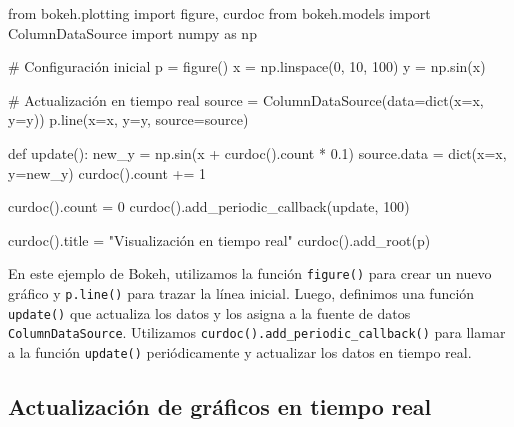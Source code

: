 \documentclass[
  a4paper,
]{article}
\newenvironment{Shaded}{}{}
\newcommand{\BuiltInTok}[1]{\textcolor[rgb]{0.84,0.23,0.29}{#1}}
\newcommand{\CommentTok}[1]{\textcolor[rgb]{0.42,0.45,0.49}{#1}}
\newcommand{\DecValTok}[1]{\textcolor[rgb]{0.00,0.36,0.77}{#1}}
\newcommand{\FloatTok}[1]{\textcolor[rgb]{0.00,0.36,0.77}{#1}}
\newcommand{\ImportTok}[1]{\textcolor[rgb]{0.01,0.18,0.38}{#1}}
\newcommand{\KeywordTok}[1]{\textcolor[rgb]{0.84,0.23,0.29}{#1}}
\newcommand{\NormalTok}[1]{\textcolor[rgb]{0.14,0.16,0.18}{#1}}
\newcommand{\OperatorTok}[1]{\textcolor[rgb]{0.14,0.16,0.18}{#1}}
\newcommand{\StringTok}[1]{\textcolor[rgb]{0.01,0.18,0.38}{#1}}
\begin{document}
\begin{Shaded}
\begin{Highlighting}[]
\ImportTok{from}\NormalTok{ bokeh.plotting }\ImportTok{import}\NormalTok{ figure, curdoc}
\ImportTok{from}\NormalTok{ bokeh.models }\ImportTok{import}\NormalTok{ ColumnDataSource}
\ImportTok{import}\NormalTok{ numpy }\ImportTok{as}\NormalTok{ np}

\CommentTok{\# Configuración inicial}
\NormalTok{p }\OperatorTok{=}\NormalTok{ figure()}
\NormalTok{x }\OperatorTok{=}\NormalTok{ np.linspace(}\DecValTok{0}\NormalTok{, }\DecValTok{10}\NormalTok{, }\DecValTok{100}\NormalTok{)}
\NormalTok{y }\OperatorTok{=}\NormalTok{ np.sin(x)}

\CommentTok{\# Actualización en tiempo real}
\NormalTok{source }\OperatorTok{=}\NormalTok{ ColumnDataSource(data}\OperatorTok{=}\BuiltInTok{dict}\NormalTok{(x}\OperatorTok{=}\NormalTok{x, y}\OperatorTok{=}\NormalTok{y))}
\NormalTok{p.line(x}\OperatorTok{=}\StringTok{\textquotesingle{}x\textquotesingle{}}\NormalTok{, y}\OperatorTok{=}\StringTok{\textquotesingle{}y\textquotesingle{}}\NormalTok{, source}\OperatorTok{=}\NormalTok{source)}

\KeywordTok{def}\NormalTok{ update():}
\NormalTok{    new\_y }\OperatorTok{=}\NormalTok{ np.sin(x }\OperatorTok{+}\NormalTok{ curdoc().count }\OperatorTok{*} \FloatTok{0.1}\NormalTok{)}
\NormalTok{    source.data }\OperatorTok{=} \BuiltInTok{dict}\NormalTok{(x}\OperatorTok{=}\NormalTok{x, y}\OperatorTok{=}\NormalTok{new\_y)}
\NormalTok{    curdoc().count }\OperatorTok{+=} \DecValTok{1}

\NormalTok{curdoc().count }\OperatorTok{=} \DecValTok{0}
\NormalTok{curdoc().add\_periodic\_callback(update, }\DecValTok{100}\NormalTok{)}

\NormalTok{curdoc().title }\OperatorTok{=} \StringTok{"Visualización en tiempo real"}
\NormalTok{curdoc().add\_root(p)}
\end{Highlighting}
\end{Shaded}

En este ejemplo de Bokeh, utilizamos la función \texttt{figure()} para
crear un nuevo gráfico y \texttt{p.line()} para trazar la línea inicial.
Luego, definimos una función \texttt{update()} que actualiza los datos y
los asigna a la fuente de datos \texttt{ColumnDataSource}. Utilizamos
\texttt{curdoc().add\_periodic\_callback()} para llamar a la función
\texttt{update()} periódicamente y actualizar los datos en tiempo real.

\hypertarget{actualizaciuxf3n-de-gruxe1ficos-en-tiempo-real}{%
\subsection{Actualización de gráficos en tiempo
real}\label{actualizaciuxf3n-de-gruxe1ficos-en-tiempo-real}}
\end{document}
